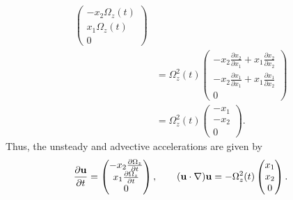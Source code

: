 \documentclass{article}
\begin{document}
\begin{itemize}
\begin{itemize}
\begin{align*}
\begin{pmatrix}
                -x_2 \Omega_z(t)\\
                x_1 \Omega_z(t)\\
                0
            \end{pmatrix}\\
            &= \Omega_z^2(t)\begin{pmatrix}
                -x_2\frac{\partial x_2}{\partial x_1} + x_1\frac{\partial x_2}{\partial x_2}\\
                -x_2\frac{\partial x_1}{\partial x_1} + x_1\frac{\partial x_1}{\partial x_2}\\
                0
            \end{pmatrix}\\
            &= \Omega_z^2(t)\begin{pmatrix}
                -x_1\\
                -x_2\\
                0
            \end{pmatrix}.
        \end{align*}
        Thus, the unsteady and advective accelerations are given by
        \[\frac{\partial \mathbf{u}}{\partial t} = \begin{pmatrix}
            -x_2\frac{\partial \Omega_z}{\partial t}\\
            x_1\frac{\partial \Omega_z}{\partial t}\\
            0
        \end{pmatrix}, \hspace{0.7cm} (\mathbf{u}\cdot \nabla)\mathbf{u} = -\Omega_z^2(t)\begin{pmatrix}
            x_1\\
            x_2\\
            0
        \end{pmatrix}.\]


\end{itemize}
\end{itemize}
\end{document}
